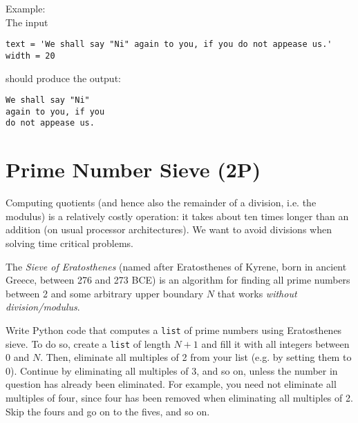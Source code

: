 \documentclass[
	english,
	fontsize=10pt,
	parskip=half,
	titlepage=true,
	DIV=12
]{scrartcl}
\newcommand*{\inPy}[1]{\texttt{#1}}
\newcommand*{\ie}{i.\;e. }
\newcommand*{\eg}{e.\;g. }
\begin{document}
Example:\\
The input
\begin{verbatim}
text = 'We shall say "Ni" again to you, if you do not appease us.'
width = 20
\end{verbatim}

should produce the output:
\begin{verbatim}
We shall say "Ni" 
again to you, if you 
do not appease us.
\end{verbatim}



\section{Prime Number Sieve (2\;P)}
Computing quotients (and hence also the remainder of a division, \ie the modulus) is a relatively costly operation: it takes about ten times longer than an addition (on usual processor architectures). We want to avoid divisions when solving time critical problems.

The \emph{Sieve of Eratosthenes} (named after Eratosthenes of Kyrene, born in ancient Greece, between 276 and 273 BCE) is an algorithm for finding all prime numbers between 2 and some arbitrary upper boundary $N$ that works \emph{without division/modulus}.

Write Python code that computes a \inPy{list} of prime numbers using Eratosthenes sieve. To do so, create a \inPy{list} of length $N+1$ and fill it with all integers between $0$ and $N$. Then, eliminate all multiples of 2 from your list (\eg by setting them to 0). Continue by eliminating all multiples of 3, and so on, unless the number in question has already been eliminated. For example, you need not eliminate all multiples of four, since four has been removed when eliminating all multiples of 2. Skip the fours and go on to the fives, and so on.
\end{document}
